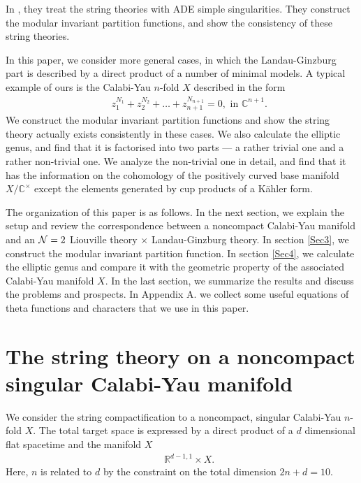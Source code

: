 \documentclass[a4paper,12pt]{article}
\numberwithin{equation}{section}
\newcommand{\Cb}{{\mathbb C}}
\newcommand{\Cx}{{\mathbb C}^{\times}}
\newcommand{\Ncal}{{\cal N}}
\newcommand{\Rb}{{\mathbb R}}
\begin{document}
In \cite{ES0002}, they treat the string theories with ADE simple
singularities.
 They construct the modular invariant
 partition functions, and show the consistency of these string theories.

In this paper, we consider more general cases, in which the
Landau-Ginzburg part is described by a direct product of
a number of minimal models.
A typical example of ours is the Calabi-Yau $n$-fold $X$
described in the form
\begin{eqnarray*}
 &&z_1^{N_1}+z_2^{N_2}+\dots+z_{n+1}^{N_{n+1}}=0, \mbox{ in }\Cb^{n+1}.
\end{eqnarray*}
We construct the modular invariant partition functions and show the 
string theory actually exists consistently in these cases. 
We also calculate
the elliptic genus, and find that it is factorised into
 two parts --- a rather trivial one
and a rather non-trivial one.
We analyze the non-trivial one in detail,
and find that it has the information 
on the cohomology of the positively curved 
base manifold $X/\Cx$ except the elements
generated by cup products of a K\"ahler form.

The organization of this paper is as follows. In the next section,
we explain the setup and review the correspondence between
a noncompact Calabi-Yau manifold and an $\Ncal=2$ Liouville theory
 $\times$ Landau-Ginzburg theory. In section \ref{Sec3}, we
construct the modular invariant partition function.
In section \ref{Sec4}, we calculate the elliptic genus and compare it with
the geometric property of the associated
 Calabi-Yau manifold $X$. In the last
section, we summarize the results and discuss the problems and prospects.
In Appendix A. we collect some useful equations of theta functions and
characters that we use in this paper.

\section{The string theory on a 
noncompact singular Calabi-Yau manifold}\label{Sec2}

We consider the string compactification to a noncompact, singular
Calabi-Yau $n$-fold $X$. The total target space is
expressed by a direct product of a $d$ dimensional flat spacetime
and the manifold $X$
\begin{eqnarray}
 && \Rb^{d-1,1}\times X. \label{TargetManifold}
\end{eqnarray}
Here, $n$ is related to $d$ by the constraint on the total
 dimension $2n+d=10$.
\end{document}
